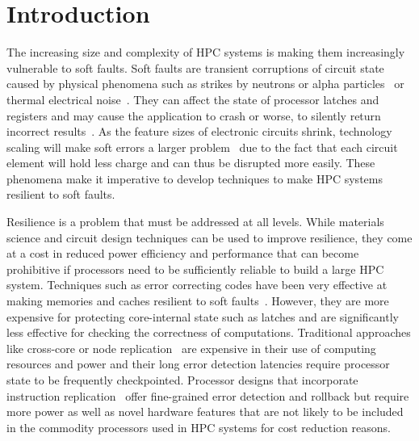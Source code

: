\documentclass{sig-alternate}
\begin{document}
\section{Introduction}
\label{sec:intro}

The increasing size and complexity of HPC systems is making them increasingly vulnerable to soft faults.
Soft faults are transient corruptions of circuit state caused by physical phenomena such as strikes by neutrons or alpha particles~\cite{baumann:2005, asciQSER:2005} or thermal electrical noise~\cite{therm_noise:2007}.
They can affect the state of processor latches and registers and may cause the application to crash or worse, to silently return incorrect results~\cite{mpi_ser:reed:2004}.
As the feature sizes of electronic circuits shrink, technology scaling will make soft errors a larger problem~\cite{err_scaling:2012} due to the fact that each circuit element will hold less charge and can thus be disrupted more easily.
These phenomena make it imperative to develop techniques to make HPC systems resilient to soft faults.

Resilience is a problem that must be addressed at all levels.
While materials science and circuit design techniques can be used to improve resilience, they come at a cost in reduced power efficiency and performance that can become prohibitive if processors need to be sufficiently reliable to build a large HPC system.
Techniques such as error correcting codes have been very effective at making memories and caches resilient to soft faults~\cite{mem_errors:2010}.
However, they are more expensive for protecting core-internal state such as latches and are significantly less effective for checking the correctness of computations.
Traditional approaches like cross-core or node replication~\cite{rmpi:2011, dyn_cmp_repl:2007} are expensive in their use of computing resources and power and their long error detection latencies require processor state to be frequently checkpointed.
Processor designs that incorporate instruction replication~\cite{repl_smt:2000} offer fine-grained error detection and rollback but require more power as well as novel hardware features that are not likely to be included in the commodity processors used in HPC systems for cost reduction reasons.
\end{document}
